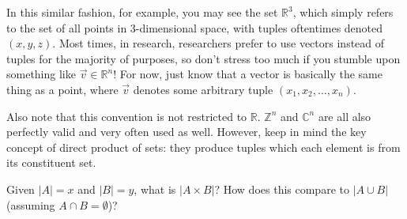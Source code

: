 In this similar fashion, for example, you may see the set $\mathbb{R}^3$, which simply refers to the set of all points in 3-dimensional space, with tuples oftentimes denoted $(x, y, z)$. Most times, in research, researchers prefer to use vectors instead of tuples for the majority of purposes, so don't stress too much if you stumble upon something like $\vec{v} \in \mathbb{R}^n$! For now, just know that a vector is basically the same thing as a point, where $\vec{v}$ denotes some arbitrary tuple $(x_1, x_2, \ldots, x_n)$.

Also note that this convention is not restricted to $\mathbb{R}$. $\mathbb{Z}^n$ and $\mathbb{C}^n$ are all also perfectly valid and very often used as well. However, keep in mind the key concept of direct product of sets: they produce tuples which each element is from its constituent set.

\begin{exercise}
    Given $|A| = x$ and $|B| = y$, what is $|A \times B|$? How does this compare to $|A \cup B|$ (assuming $A \cap B = \emptyset$)?
\end{exercise}

